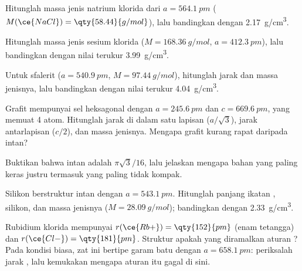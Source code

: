 \begin{exercise}[$\star\star$]\label{exo:b1:crystals-ionic-covalent:6}
Hitunglah massa jenis natrium klorida dari $a = \qty{564.1}{pm}$
($M(\ce{NaCl}) = \qty{58.44}{g/mol}$), lalu bandingkan dengan
\qty{2.17}{g/cm^3}.
\end{exercise}

\begin{exercise}[$\star\star$]\label{exo:b1:crystals-ionic-covalent:7}
Hitunglah massa jenis sesium klorida ($M = \qty{168.36}{g/mol}$,
$a = \qty{412.3}{pm}$), lalu bandingkan dengan nilai terukur
\qty{3.99}{g/cm^3}.
\end{exercise}

\begin{exercise}[$\star\star$]\label{exo:b1:crystals-ionic-covalent:8}
Untuk sfalerit ($a = \qty{540.9}{pm}$, $M = \qty{97.44}{g/mol}$),
hitunglah jarak  dan massa jenisnya, lalu bandingkan dengan
nilai terukur \qty{4.04}{g/cm^3}.
\end{exercise}

\begin{exercise}[$\star\star$]\label{exo:b1:crystals-ionic-covalent:9}
Grafit mempunyai sel heksagonal dengan $a = \qty{245.6}{pm}$ dan
$c = \qty{669.6}{pm}$, yang memuat 4 atom. Hitunglah jarak  di
dalam satu lapisan ($a/\sqrt3$), jarak antarlapisan ($c/2$), dan massa
jenisnya. Mengapa grafit kurang rapat daripada intan?
\end{exercise}

\begin{exercise}[$\star\star\star$]\label{exo:b1:crystals-ionic-covalent:10}
Buktikan bahwa  intan adalah $\pi\sqrt3/16$, lalu jelaskan
mengapa bahan yang paling keras justru termasuk yang paling tidak
kompak.
\end{exercise}

\begin{exercise}[$\star\star\star$]\label{exo:b1:crystals-ionic-covalent:11}
Silikon berstruktur intan dengan $a = \qty{543.1}{pm}$. Hitunglah
panjang ikatan ,  silikon, dan massa jenisnya
($M = \qty{28.09}{g/mol}$); bandingkan dengan \qty{2.33}{g/cm^3}.
\end{exercise}

\begin{exercise}[$\star\star\star$]\label{exo:b1:crystals-ionic-covalent:12}
Rubidium klorida mempunyai $r(\ce{Rb+}) = \qty{152}{pm}$ (enam tetangga)
dan $r(\ce{Cl-}) = \qty{181}{pm}$. Struktur apakah yang diramalkan aturan
? Pada kondisi biasa, zat ini bertipe garam batu dengan
$a = \qty{658.1}{pm}$: periksalah jarak , lalu kemukakan
mengapa aturan itu gagal di sini.
\end{exercise}

